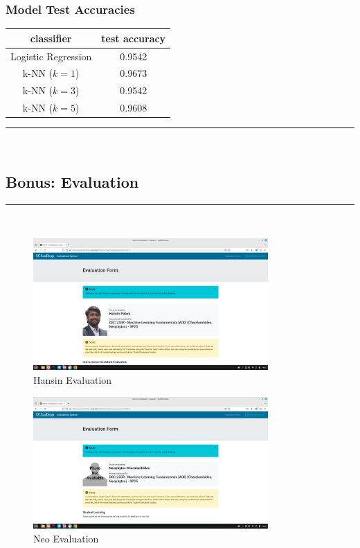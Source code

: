\documentclass{article}
\begin{document}
\subsubsection*{Model Test Accuracies}
\parbox{\textwidth}{
\begin{center}
\begin{tabular}{|c|c|}
\hline
\textbf{classifier} & \textbf{test accuracy} \\
\hline
Logistic Regression & 0.9542 \\
k-NN ($k=1$) & 0.9673 \\
k-NN ($k=3$) & 0.9542 \\
k-NN ($k=5$) & 0.9608 \\
\hline
\end{tabular}
\end{center}
}

\noindent\rule{\textwidth}{0.4pt}\\

\newpage
\subsection*{Bonus: Evaluation}
\noindent\rule{\textwidth}{0.4pt}\\

\begin{figure}[h!] %
  \centering %
  \includegraphics[width=0.8\textwidth, height=0.45\textheight, keepaspectratio]{te_1.png}
  \caption{Hansin Evaluation}
  \label{fig:te1}
\end{figure}

\begin{figure}[h!]
  \centering
  \includegraphics[width=0.8\textwidth, height=0.45\textheight, keepaspectratio]{te_2.png}
  \caption{Neo Evaluation}
  \label{fig:te2}
\end{figure}
\end{document}
